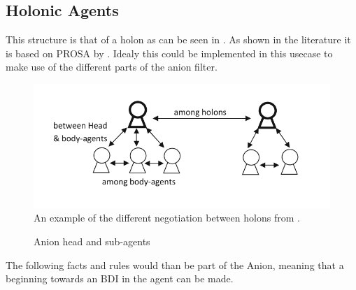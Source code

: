 \subsection{Holonic Agents}

This structure is that of a holon as can be seen in . As shown in the literature it is based on PROSA by \citep{van1998reference}. Idealy this could be implemented in this usecase to make use of the different parts of the anion filter.
\begin{figure}[h]
	\centering
	\includegraphics[width=0.7\linewidth]{img/holon_example}
	\caption{An example of the different negotiation between holons from \citet{beheshti2016negotiations}.}
	\label{fig:holonexample}
\end{figure}


\begin{figure}[h]
	
	\centering
	\caption{Anion head and sub-agents}
	\label{fig:anion-head-sub}
	
\end{figure}

The following facts and rules would than be part of the Anion, meaning that a beginning towards an BDI in the agent can be made.

